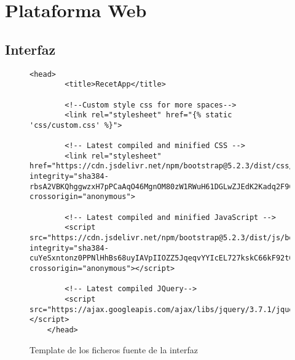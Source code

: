 \chapter{Plataforma Web}
\section{Interfaz}
\begin{figure}[H]
    \begin{lstlisting}[style=consola]
    <head>
        <title>RecetApp</title>

        <!--Custom style css for more spaces-->
        <link rel="stylesheet" href="{% static 'css/custom.css' %}">

        <!-- Latest compiled and minified CSS -->
        <link rel="stylesheet" href="https://cdn.jsdelivr.net/npm/bootstrap@5.2.3/dist/css/bootstrap.min.css" integrity="sha384-rbsA2VBKQhggwzxH7pPCaAqO46MgnOM80zW1RWuH61DGLwZJEdK2Kadq2F9CUG65" crossorigin="anonymous">

        <!-- Latest compiled and minified JavaScript -->
        <script src="https://cdn.jsdelivr.net/npm/bootstrap@5.2.3/dist/js/bootstrap.min.js" integrity="sha384-cuYeSxntonz0PPNlHhBs68uyIAVpIIOZZ5JqeqvYYIcEL727kskC66kF92t6Xl2V" crossorigin="anonymous"></script>

        <!-- Latest compiled JQuery-->
        <script src="https://ajax.googleapis.com/ajax/libs/jquery/3.7.1/jquery.min.js"></script>
    </head>
    \end{lstlisting}
    \caption{Template de los ficheros fuente de la \gls{interfaz}}
    \label{sni:docker}
\end{figure}

